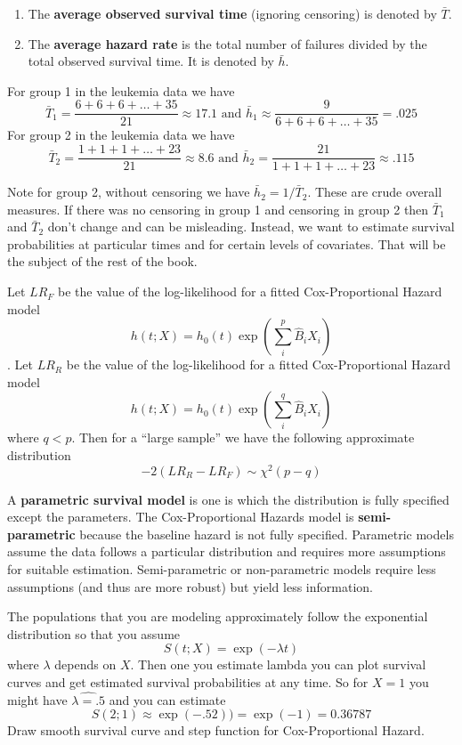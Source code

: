 \documentclass{article}
\begin{document}
\begin{enumerate}
\item The \textbf{average observed survival time }(ignoring censoring) is denoted by $\bar{T}$. 
\item The \textbf{average hazard rate} is the total number of failures divided by the total observed survival time. It is denoted by $\bar{h}$. 
\end{enumerate}
 For group 1 in the leukemia data we have 
\[ \bar{T}_1 = \frac{6 + 6 + 6 + \ldots + 35}{21} \approx 17.1 \text { and } \bar{h}_1 \approx \frac{9}{6 + 6 + 6 + \ldots + 35} = .025
\]
For group 2 in the leukemia data we have 
\[ \bar{T}_2 = \frac{1 + 1 + 1 + \ldots + 23}{21} \approx 8.6 \text { and } \bar{h}_2 = \frac{21}{1 + 1 + 1 + \ldots + 23} \approx .115
\] 

Note for group 2, without censoring we have $\bar{h}_2 = 1/\bar{T}_2$. These are crude overall measures. If there was no censoring in group 1 and censoring in group 2 then $\bar{T}_1$ and $\bar{T}_2$ don't change and can be misleading. Instead, we want to estimate survival probabilities at particular times and for certain levels of covariates. That will be the subject of the rest of the book. 
 
 





 Let $LR_F$ be the value of the log-likelihood for a fitted Cox-Proportional Hazard model
\[ h(t;X) = h_0(t) \exp(\sum_i^p \hat{B}_iX_i) \].
Let $LR_R$ be the value of the log-likelihood for a fitted Cox-Proportional Hazard model
\[ h(t;X) = h_0(t) \exp(\sum_i^q \hat{B}_iX_i) \]
where $q<p$.
Then for a ``large sample'' we have the following approximate distribution
\[
-2(LR_R - LR_F) \sim \chi^2(p-q)
\]


A \textbf{parametric survival model} is one is which the distribution is fully specified except the parameters. The Cox-Proportional Hazards model is \textbf{semi-parametric} because the baseline hazard is not fully specified. Parametric models assume the data follows a particular distribution and requires more assumptions for suitable estimation. Semi-parametric or non-parametric models require less assumptions (and thus are more robust) but yield less information.

 The populations that you are modeling approximately follow the exponential distribution so that you assume
\[
S(t;X) = \exp(-\lambda t)
\]
where $\lambda$ depends on $X$.
Then one you estimate lambda you can plot survival curves and get estimated survival probabilities at any time.
So for $X=1$ you might have $\hat{\lambda=.5}$ and you can estimate
\[ S(2;1) \approx \exp(-.5 2)) = \exp(-1) = 0.36787
\]
\NTS Draw smooth survival curve and step function for Cox-Proportional Hazard.
\end{document}
